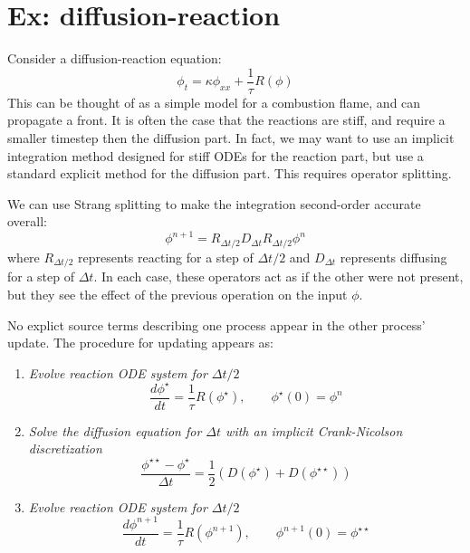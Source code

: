 \section{Ex: diffusion-reaction}

Consider a diffusion-reaction equation:
\begin{equation}
\phi_t = \kappa \phi_{xx} + \frac{1}{\tau} R(\phi)
\end{equation}
This can be thought of as a simple model for a combustion flame, and
can propagate a front.  It is often the case that the reactions are
stiff, and require a smaller timestep then the diffusion part.  In
fact, we may want to use an implicit integration method designed for
stiff ODEs for the reaction part, but use a standard explicit method
for the diffusion part.  This requires operator splitting.

We can use Strang splitting \cite{strang} to make the integration
second-order accurate overall:
\begin{equation}
\phi^{n+1} = R_{\Delta t/2} D_{\Delta t} R_{\Delta t/2} \phi^n
\end{equation}
where $R_{\Delta t/2}$ represents reacting for a step of $\Delta t/2$
and $D_{\Delta t}$ represents diffusing for a step of $\Delta t$.  In
each case, these operators act as if the other were not present, but
they see the effect of the previous operation on the input $\phi$.  

No explict source terms describing one process appear in the other
process' update.  The procedure for updating appears as:
\begin{enumerate}
\item {\em Evolve reaction ODE system for $\Delta t/2$}
   \begin{equation}
   \frac{d\phi^\star}{dt} = \frac{1}{\tau} R(\phi^\star), \qquad 
   \phi^\star(0) = \phi^n
   \end{equation}

\item {\em Solve the diffusion equation for $\Delta t$ with an
           implicit Crank-Nicolson discretization}
   \begin{equation}
   \frac{\phi^{\star\star} - \phi^\star}{\Delta t} =
      \frac{1}{2} (D(\phi^\star) + D(\phi^{\star\star}))
   \end{equation}

\item {\em Evolve reaction ODE system for $\Delta t/2$}
   \begin{equation}
   \frac{d\phi^{n+1}}{dt} = \frac{1}{\tau} R(\phi^{n+1}), \qquad 
   \phi^{n+1}(0) = \phi^{\star\star}
   \end{equation}

\end{enumerate}

